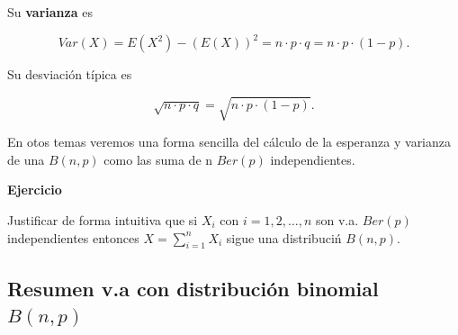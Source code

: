 \documentclass[]{book}
\begin{document}
Su \textbf{varianza} es

\[Var(X)=E(X^2)-\left(E(X)\right)^2=n\cdot p \cdot q=n\cdot p\cdot (1-p).\]

Su desviación típica es

\[\sqrt{n\cdot p\cdot q}=\sqrt{n\cdot p\cdot (1-p)}.\]

En otos temas veremos una forma sencilla del cálculo de la esperanza y varianza de una \(B(n,p)\) como las suma de n \(Ber(p)\) independientes.

\textbf{Ejercicio}

Justificar de forma intuitiva que si \(X_i\) con \(i=1,2,\ldots, n\) son v.a. \(Ber(p)\) independientes entonces \(X=\displaystyle\sum_{i=1}^n X_i\) sigue una distribuciń \(B(n,p).\)

\hypertarget{resumen-v.a-con-distribuciuxf3n-binomial-bnp}{%
\subsection{\texorpdfstring{Resumen v.a con distribución binomial \(B(n,p)\)}{Resumen v.a con distribución binomial B(n,p)}}\label{resumen-v.a-con-distribuciuxf3n-binomial-bnp}}
\end{document}
